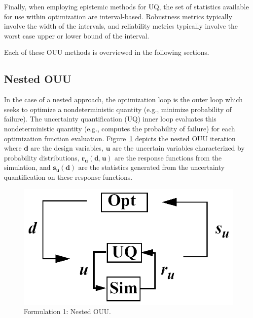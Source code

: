 Finally, when employing epistemic methods for UQ, the set of
statistics available for use within optimization are interval-based.
Robustness metrics typically involve the width of the intervals, and
reliability metrics typically involve the worst case upper or lower
bound of the interval.

Each of these OUU methods is overviewed in the following sections.

\subsection{Nested OUU}\label{adv_models:ouu:nested}

In the case of a nested approach, the optimization loop is the outer
loop which seeks to optimize a nondeterministic quantity (e.g.,
minimize probability of failure). The uncertainty quantification (UQ)
inner loop evaluates this nondeterministic quantity (e.g., computes
the probability of failure) for each optimization function evaluation.
Figure~\ref{adv_models:figure08} depicts the nested OUU iteration where
$\mathit{\mathbf{d}}$ are the design variables, $\mathit{\mathbf{u}}$
are the uncertain variables characterized by probability
distributions, $\mathit{\mathbf{r_{u}(d,u)}}$ are the response
functions from the simulation, and $\mathit{\mathbf{s_{u}(d)}}$ are
the statistics generated from the uncertainty quantification on these
response functions.

\begin{figure}
  \centering
  \includegraphics[scale=0.33]{images/nested_ouu}
  \caption{Formulation 1: Nested OUU.}
  \label{adv_models:figure08}
\end{figure}

